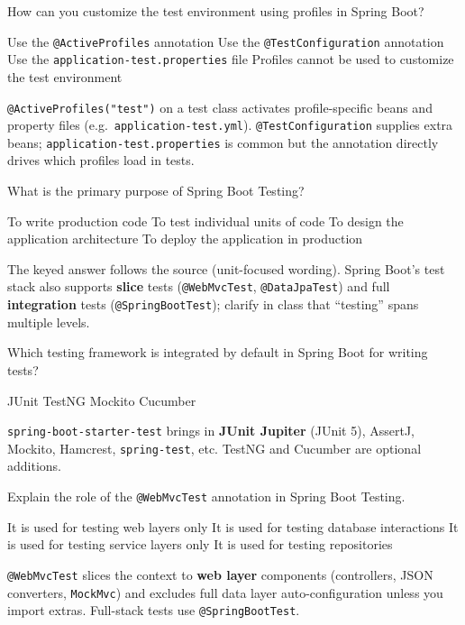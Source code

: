 \question[4]
How can you customize the test environment using profiles in Spring Boot?
\begin{choices}
  \CorrectChoice Use the \texttt{@ActiveProfiles} annotation
  \choice Use the \texttt{@TestConfiguration} annotation
  \choice Use the \texttt{application-test.properties} file
  \choice Profiles cannot be used to customize the test environment
\end{choices}
\begin{solution}
  \texttt{@ActiveProfiles("test")} on a test class activates profile-specific beans and property files (e.g.\ \texttt{application-test.yml}). \texttt{@TestConfiguration} supplies extra beans; \texttt{application-test.properties} is common but the annotation directly drives which profiles load in tests.
\end{solution}

\question[4]
What is the primary purpose of Spring Boot Testing?
\begin{choices}
  \choice To write production code
  \CorrectChoice To test individual units of code
  \choice To design the application architecture
  \choice To deploy the application in production
\end{choices}
\begin{solution}
  The keyed answer follows the source (unit-focused wording). Spring Boot's test stack also supports \textbf{slice} tests (\texttt{@WebMvcTest}, \texttt{@DataJpaTest}) and full \textbf{integration} tests (\texttt{@SpringBootTest}); clarify in class that ``testing'' spans multiple levels.
\end{solution}

\question[4]
Which testing framework is integrated by default in Spring Boot for writing tests?
\begin{choices}
  \CorrectChoice JUnit
  \choice TestNG
  \choice Mockito
  \choice Cucumber
\end{choices}
\begin{solution}
  \texttt{spring-boot-starter-test} brings in \textbf{JUnit Jupiter} (JUnit 5), AssertJ, Mockito, Hamcrest, \texttt{spring-test}, etc. TestNG and Cucumber are optional additions.
\end{solution}

\question[4]
Explain the role of the \texttt{@WebMvcTest} annotation in Spring Boot Testing.
\begin{choices}
  \CorrectChoice It is used for testing web layers only
  \choice It is used for testing database interactions
  \choice It is used for testing service layers only
  \choice It is used for testing repositories
\end{choices}
\begin{solution}
  \texttt{@WebMvcTest} slices the context to \textbf{web layer} components (controllers, JSON converters, \texttt{MockMvc}) and excludes full data layer auto-configuration unless you import extras. Full-stack tests use \texttt{@SpringBootTest}.
\end{solution}

